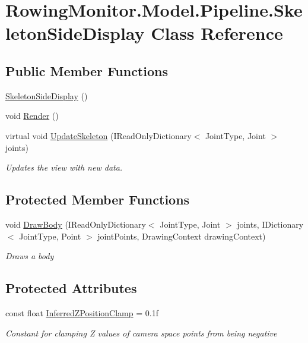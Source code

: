 \hypertarget{class_rowing_monitor_1_1_model_1_1_pipeline_1_1_skeleton_side_display}{}\section{Rowing\+Monitor.\+Model.\+Pipeline.\+Skeleton\+Side\+Display Class Reference}
\label{class_rowing_monitor_1_1_model_1_1_pipeline_1_1_skeleton_side_display}
\subsection*{Public Member Functions}
\begin{DoxyCompactItemize}
\item 
\hyperlink{class_rowing_monitor_1_1_model_1_1_pipeline_1_1_skeleton_side_display_aa9cea6100e45eb5dd9ce60141287659d}{Skeleton\+Side\+Display} ()
\item 
void \hyperlink{class_rowing_monitor_1_1_model_1_1_pipeline_1_1_skeleton_side_display_a5957c0188fc2ceabae1e20f0d8c2c057}{Render} ()
\item 
virtual void \hyperlink{class_rowing_monitor_1_1_model_1_1_pipeline_1_1_skeleton_side_display_a3bd1bbfaa2c32be913414b1e4cd8a32d}{Update\+Skeleton} (I\+Read\+Only\+Dictionary$<$ Joint\+Type, Joint $>$ joints)
\begin{DoxyCompactList}\small\item\em Updates the view with new data. \end{DoxyCompactList}\end{DoxyCompactItemize}
\subsection*{Protected Member Functions}
\begin{DoxyCompactItemize}
\item 
void \hyperlink{class_rowing_monitor_1_1_model_1_1_pipeline_1_1_skeleton_side_display_af2a9cdb39da2e18683de666a255e5015}{Draw\+Body} (I\+Read\+Only\+Dictionary$<$ Joint\+Type, Joint $>$ joints, I\+Dictionary$<$ Joint\+Type, Point $>$ joint\+Points, Drawing\+Context drawing\+Context)
\begin{DoxyCompactList}\small\item\em Draws a body \end{DoxyCompactList}\end{DoxyCompactItemize}
\subsection*{Protected Attributes}
\begin{DoxyCompactItemize}
\item 
const float \hyperlink{class_rowing_monitor_1_1_model_1_1_pipeline_1_1_skeleton_side_display_a1d54abd0be96b596c42bdf768df42b5d}{Inferred\+Z\+Position\+Clamp} = 0.\+1f
\begin{DoxyCompactList}\small\item\em Constant for clamping Z values of camera space points from being negative \end{DoxyCompactList}\end{DoxyCompactItemize}
